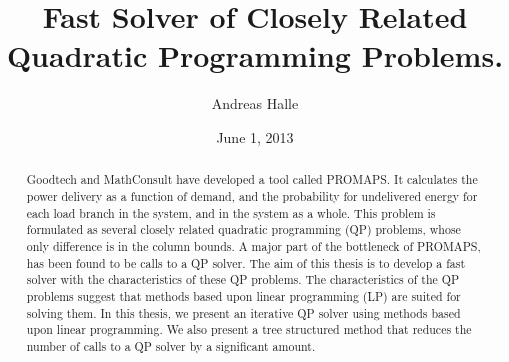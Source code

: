 \documentclass[a4paper,12pt]{report}
\begin{document}
\title{Fast Solver of Closely Related Quadratic Programming
       Problems.}
\date{June 1, 2013}
\author{Andreas Halle}
\maketitle
\thispagestyle{empty}
\newpage

\thispagestyle{empty}
\begin{abstract}
Goodtech and MathConsult have developed a tool called PROMAPS.
It calculates the power delivery as a function of demand, and the probability
for undelivered energy for each load branch in the system, and in the
system as a whole. This problem is formulated as several closely related 
quadratic programming (QP) problems, whose only difference is in the column
bounds. A major part of the bottleneck of PROMAPS, has been found to be
calls to a QP solver. The aim of this thesis is to develop a fast solver
with the characteristics of these QP problems. The characteristics of the
QP problems suggest that methods based upon linear programming (LP) are
suited for solving them. In this thesis, we present an iterative QP solver
using methods based upon linear programming. We also present a tree structured
method that reduces the number of calls to a QP solver by a significant amount.

\end{abstract}
\newpage
\end{document}
